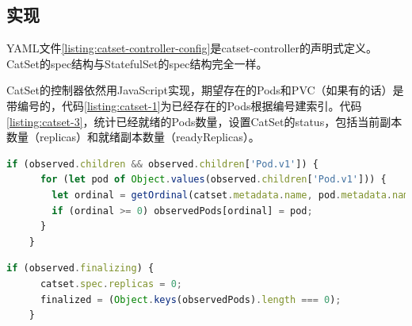 \documentclass[macfonts,master]{njuthesis}
\begin{document}
\subsection{实现}

YAML文件\ref{listing:catset-controller-config}是catset-controller的声明式定义。CatSet的spec结构与StatefulSet的spec结构完全一样。



CatSet的控制器依然用JavaScript实现，期望存在的Pods和PVC（如果有的话）是带编号的，代码\ref{listing:catset-1}为已经存在的Pods根据编号建索引。代码\ref{listing:catset-3}，统计已经就绪的Pods数量，设置CatSet的status，包括当前副本数量（replicas）和就绪副本数量（readyReplicas）。

\begin{lstlisting}[language=JavaScript,caption=为已存在的Pods建索引,label=listing:catset-1,gobble=4]
    if (observed.children && observed.children['Pod.v1']) {
      for (let pod of Object.values(observed.children['Pod.v1'])) {
        let ordinal = getOrdinal(catset.metadata.name, pod.metadata.name);
        if (ordinal >= 0) observedPods[ordinal] = pod;
      }
    }
\end{lstlisting}

\newpage
\begin{lstlisting}[language=JavaScript,caption=删除后清理,label=listing:catset-2,gobble=4]
    if (observed.finalizing) {
      catset.spec.replicas = 0;
      finalized = (Object.keys(observedPods).length === 0);
    }
\end{lstlisting}
\end{document}
